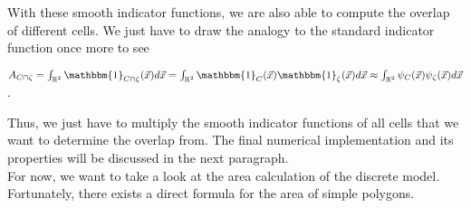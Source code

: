 \documentclass[a4paper,12pt,leqno]{article}
\theoremstyle{plain}
\theoremstyle{remark}
\begin{document}
With these smooth indicator functions, we are also able to compute the overlap of different cells. We just have to draw the analogy to the standard indicator function once more to see 
\begin{center}
	$A_{C \cap \zeta} = \int_{\mathbb{R}^2} \mathbbm{1}_{C \cap \zeta}(\vec{x}) d\vec{x} = \int_{\mathbb{R}^2} \mathbbm{1}_{C}(\vec{x})\mathbbm{1}_{\zeta}(\vec{x}) d\vec{x} \approx \int_{\mathbb{R}^2} \psi_{C}(\vec{x})\psi_{\zeta}(\vec{x}) d\vec{x}$.	
\end{center}
Thus, we just have to multiply the smooth indicator functions of all cells that we want to determine the overlap from. The final numerical implementation and its properties will be discussed in the next paragraph. \\
For now, we want to take a look at the area calculation of the discrete model. Fortunately, there exists a direct formula for the area of simple polygons. \\
\end{document}
